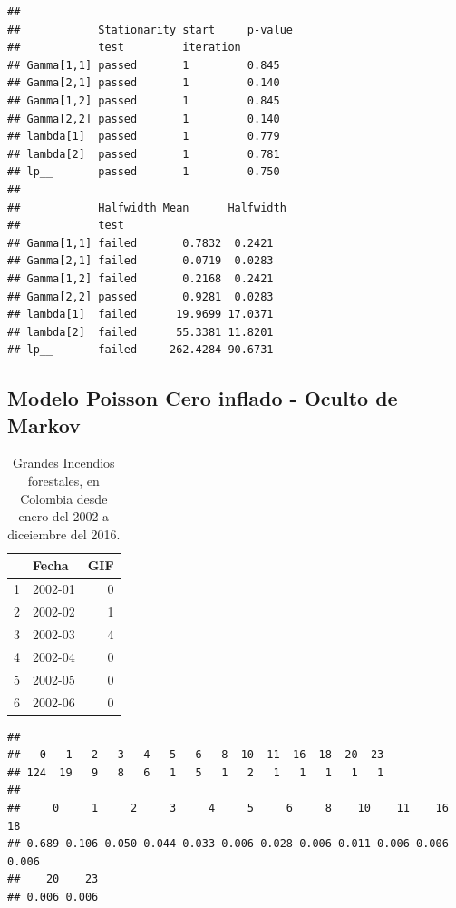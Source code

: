 \documentclass[a4paper]{article}\usepackage[]{graphicx}\usepackage[]{color}
\makeatletter
\newenvironment{kframe}{%
 \def\at@end@of@kframe{}%
 \ifinner\ifhmode%
  \def\at@end@of@kframe{\end{minipage}}%
  \begin{minipage}{\columnwidth}%
 \fi\fi%
 \def\FrameCommand##1{\hskip\@totalleftmargin \hskip-\fboxsep
 \colorbox{shadecolor}{##1}\hskip-\fboxsep
     \hskip-\linewidth \hskip-\@totalleftmargin \hskip\columnwidth}%
 \MakeFramed {\advance\hsize-\width
   \@totalleftmargin\z@ \linewidth\hsize
   \@setminipage}}%
 {\par\unskip\endMakeFramed%
 \at@end@of@kframe}
\newenvironment{knitrout}{}{} %
\makeatother
\begin{document}
\begin{knitrout}
\color{fgcolor}\begin{kframe}
\begin{verbatim}
##                                          
##            Stationarity start     p-value
##            test         iteration        
## Gamma[1,1] passed       1         0.845  
## Gamma[2,1] passed       1         0.140  
## Gamma[1,2] passed       1         0.845  
## Gamma[2,2] passed       1         0.140  
## lambda[1]  passed       1         0.779  
## lambda[2]  passed       1         0.781  
## lp__       passed       1         0.750  
##                                         
##            Halfwidth Mean      Halfwidth
##            test                         
## Gamma[1,1] failed       0.7832  0.2421  
## Gamma[2,1] failed       0.0719  0.0283  
## Gamma[1,2] failed       0.2168  0.2421  
## Gamma[2,2] passed       0.9281  0.0283  
## lambda[1]  failed      19.9699 17.0371  
## lambda[2]  failed      55.3381 11.8201  
## lp__       failed    -262.4284 90.6731
\end{verbatim}
\end{kframe}
\end{knitrout}


\subsection{Modelo Poisson Cero inflado - Oculto de Markov}




\begin{table}[ht]
\centering
\begin{tabular}{rlr}
  \hline
 & Fecha & GIF \\ 
  \hline
1 & 2002-01 &   0 \\ 
  2 & 2002-02 &   1 \\ 
  3 & 2002-03 &   4 \\ 
  4 & 2002-04 &   0 \\ 
  5 & 2002-05 &   0 \\ 
  6 & 2002-06 &   0 \\ 
   \hline
\end{tabular}
\caption{Grandes Incendios forestales, en Colombia desde enero del 2002 a diceiembre del 2016.} 
\end{table}


\begin{knitrout}
\color{fgcolor}\begin{kframe}
\begin{verbatim}
## 
##   0   1   2   3   4   5   6   8  10  11  16  18  20  23 
## 124  19   9   8   6   1   5   1   2   1   1   1   1   1
## 
##     0     1     2     3     4     5     6     8    10    11    16    18 
## 0.689 0.106 0.050 0.044 0.033 0.006 0.028 0.006 0.011 0.006 0.006 0.006 
##    20    23 
## 0.006 0.006
\end{verbatim}
\end{kframe}
\end{knitrout}
\end{document}
